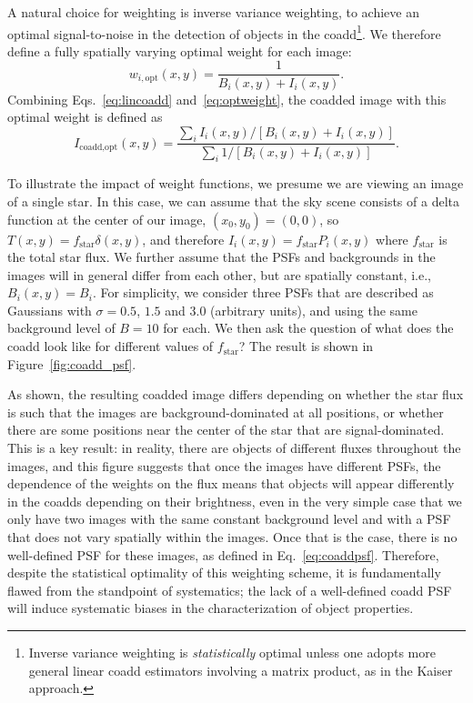 \documentclass{aastex63}
\begin{document}
A natural choice for weighting is inverse variance weighting, to achieve an optimal signal-to-noise in the detection of objects in the coadd\footnote{Inverse variance weighting is {\em statistically} optimal unless one adopts more general linear coadd estimators involving a matrix product, as in the Kaiser approach.}.  We therefore define a fully spatially varying optimal weight for each image:
\begin{equation}\label{eq:optweight}
    w_{i,\text{opt}}(x,y) = \frac{1}{B_i(x,y)+I_i(x,y)}.
\end{equation}
Combining Eqs.~\eqref{eq:lincoadd} and~\eqref{eq:optweight}, the coadded image with this optimal weight is defined as
\begin{equation}\label{eq:optcoadd}
    I_\text{coadd,opt}(x,y) = \frac{\sum_i I_i(x,y)/\left[B_i(x,y)+I_i(x,y)\right]}{\sum_i 1/\left[B_i(x,y)+I_i(x,y)\right]}.
\end{equation}

To illustrate the impact of weight functions, we presume we are viewing an image of a single star.  In this case, we can assume that the sky scene consists of a delta function at the center of our image, $(x_0,y_0) = (0,0)$, so  $T(x,y)=f_\text{star}\delta(x,y)$, and therefore $I_i(x,y)=f_\text{star}P_i(x,y)$ where $f_\text{star}$ is the total star flux.  We further assume that the PSFs and backgrounds in the images will in general differ from each other, but are spatially constant, i.e., $B_i(x,y)=B_i$.  For simplicity, we consider three PSFs that are described as Gaussians with $\sigma=0.5$, $1.5$ and $3.0$ (arbitrary units), and using the same background level of $B=10$ for each.  We then ask the question of what does the coadd look like for different values of $f_\text{star}$?  The result is shown in Figure~\ref{fig:coadd_psf}.

As shown, the resulting coadded image differs depending on whether the star flux is such that the images are background-dominated at all positions, or whether there are some positions near the center of the star that are signal-dominated.  This is a key result: in reality, there are objects of different fluxes throughout the images, and this figure suggests that once the images have different PSFs, the dependence of the weights on the flux means that objects will appear differently in the coadds depending on their brightness, even in the very simple case that we only have two images with the same constant background level and with a PSF that does not vary spatially within the images.  Once that is the case, there is no well-defined PSF for these images, as defined in Eq.~\eqref{eq:coaddpsf}.  Therefore, despite the statistical optimality of this weighting scheme, it is fundamentally flawed from the standpoint of systematics; the lack of a well-defined coadd PSF will induce systematic biases in the characterization of object properties.
\end{document}
